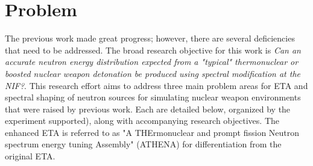 \section{Problem} \label{problem}
The previous work made great progress; however, there are several deficiencies that need to be addressed. The broad research objective for this work is \textit{Can an accurate neutron energy distribution expected from a "typical" thermonuclear or boosted nuclear weapon detonation be produced using spectral modification at the NIF?}. This research effort aims to address three main problem areas for ETA and spectral shaping of neutron sources for simulating nuclear weapon environments that were raised by previous work. Each are detailed below, organized by the experiment supported), along with accompanying research objectives. The enhanced ETA is referred to as "A THErmonuclear and prompt fission Neutron spectrum energy tuning Assembly" (ATHENA) for differentiation from the original ETA.


